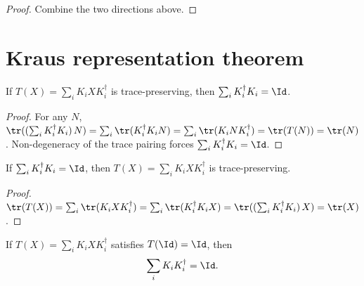 \begin{proof}
    \leanok
    Combine the two directions above.
\end{proof}

\section{Kraus representation theorem}
\label{sec:kraus_representation}

\begin{theorem}\label{thm:kraus_sum_conjTranspose_mul_of_tp}
    \leanok
    If $T(X) = \sum_i K_i X K_i^\dagger$ is trace-preserving, then
    $\sum_i K_i^\dagger K_i = \Id$.
\end{theorem}

\begin{proof}
    \leanok
    For any $N$,
    $\tr((\sum_i K_i^\dagger K_i)\,N)
        = \sum_i \tr(K_i^\dagger K_i N)
        = \sum_i \tr(K_i N K_i^\dagger)
        = \tr(T(N))
        = \tr(N)$.
    Non-degeneracy of the trace pairing forces
    $\sum_i K_i^\dagger K_i = \Id$.
\end{proof}

\begin{theorem}\label{thm:kraus_tp_of_sum_conjTranspose_mul}
    \leanok
    If $\sum_i K_i^\dagger K_i = \Id$, then
    $T(X) = \sum_i K_i X K_i^\dagger$ is trace-preserving.
\end{theorem}

\begin{proof}
    \leanok
    $\tr(T(X))
        = \sum_i \tr(K_i X K_i^\dagger)
        = \sum_i \tr(K_i^\dagger K_i X)
        = \tr((\textstyle\sum_i K_i^\dagger K_i)\,X)
        = \tr(X)$.
\end{proof}

\begin{theorem}
    \label{thm:kraus_sum_mul_conjTranspose_of_unital}
    \leanok
    If $T(X) = \sum_i K_i X K_i^\dagger$ satisfies $T(\Id) = \Id$, then
    \[
        \sum_i K_i K_i^\dagger = \Id.
    \]
\end{theorem}

